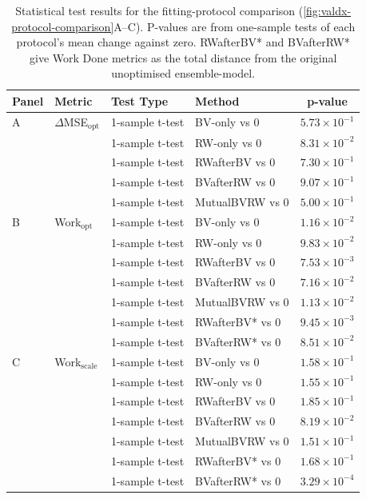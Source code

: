\begin{table}[htbp]
    \centering
    \small
    \begin{tabular}{@{}llllc@{}}
    \toprule
        \textbf{Panel} & \textbf{Metric} & \textbf{Test Type} & \textbf{Method} & \textbf{p-value} \\
        \midrule
        A & $\Delta$MSE$_{\text{opt}}$ & 1-sample t-test & BV-only vs 0 & $5.73 \times 10^{-1}$ \\
        & & 1-sample t-test & RW-only vs 0 & $8.31 \times 10^{-2}$ \\
        & & 1-sample t-test & RWafterBV vs 0 & $7.30 \times 10^{-1}$ \\
        & & 1-sample t-test & BVafterRW vs 0 & $9.07 \times 10^{-1}$ \\
        & & 1-sample t-test & MutualBVRW vs 0 & $5.00 \times 10^{-1}$ \\
        \midrule
        B & Work$_{\text{opt}}$ & 1-sample t-test & BV-only vs 0 & $1.16 \times 10^{-2}$ \\
        & & 1-sample t-test & RW-only vs 0 & $9.83 \times 10^{-2}$ \\
        & & 1-sample t-test & RWafterBV vs 0 & $7.53 \times 10^{-3}$ \\
        & & 1-sample t-test & BVafterRW vs 0 & $7.16 \times 10^{-2}$ \\
        & & 1-sample t-test & MutualBVRW vs 0 & $1.13 \times 10^{-2}$ \\
        & & 1-sample t-test & RWafterBV* vs 0 & $9.45 \times 10^{-3}$ \\
        & & 1-sample t-test & BVafterRW* vs 0 & $8.51 \times 10^{-2}$ \\
        \midrule
        C & Work$_{\text{scale}}$ & 1-sample t-test & BV-only vs 0 & $1.58 \times 10^{-1}$ \\
        & & 1-sample t-test & RW-only vs 0 & $1.55 \times 10^{-1}$ \\
        & & 1-sample t-test & RWafterBV vs 0 & $1.85 \times 10^{-1}$ \\
        & & 1-sample t-test & BVafterRW vs 0 & $8.19 \times 10^{-2}$ \\
        & & 1-sample t-test & MutualBVRW vs 0 & $1.51 \times 10^{-1}$ \\
        & & 1-sample t-test & RWafterBV* vs 0 & $1.68 \times 10^{-1}$ \\
        & & 1-sample t-test & BVafterRW* vs 0 & $3.29 \times 10^{-4}$ \\
        \bottomrule
    \end{tabular}
    \caption{Statistical test results for the fitting-protocol comparison (\cref{fig:valdx-protocol-comparison}A--C). P-values are from one-sample tests of each protocol's mean change against zero. RWafterBV* and BVafterRW* give Work Done metrics as the total distance from the original unoptimised ensemble-model.}
    \label{tab:valdx-protocol-tests}
\end{table}

